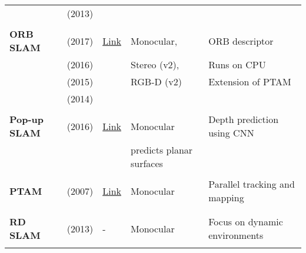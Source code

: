 {\begin{longtable}{l|l|l|l|l}
			& \cite{Leutenegger2013} (2013)     &                                                                    &                       &\\
			&                                   &                                                                    &                       &\\
			\textbf{ORB SLAM}      & \cite{Mur-Artal2017} (2017)       & \href{https://github.com/raulmur/ORB_SLAM2}{Link}                  &  Monocular,           & ORB descriptor\\
			& \cite{Mur-Artal} (2016)      &                                                                    &  Stereo (v2),         & Runs on CPU\\
			& \cite{orbslam} (2015)       &                                                                    &  RGB-D (v2)           & Extension of PTAM\\
			& \cite{Mur-Artal2014} (2014)       &                                                                    &                       &\\
			&                                   &                                                                    &                       &\\
			\textbf{Pop-up SLAM}   & \cite{Yang2016} (2016)            & {\href{https://github.com/shichaoy/pop_up_image}{Link}}            & Monocular             & Depth prediction using CNN \\
			&         &          &  predicts planar surfaces\\
			&                                   &                                                                    &                       &\\
			\textbf{PTAM}          & \cite{4538852} (2007)           & {\href{https://github.com/Oxford-PTAM/PTAM-GPL}{Link}}             & Monocular             & Parallel tracking and mapping\\
			&                                   &                                                                    &                       &\\
			&                                   &                                                                    &                       &\\
			\textbf{RD SLAM}       & \cite{Tan2013a} (2013)            & -                                                                  & Monocular             & Focus on dynamic environments\\
			&                                   &                                                                    &                       &\\

\end{longtable}}

